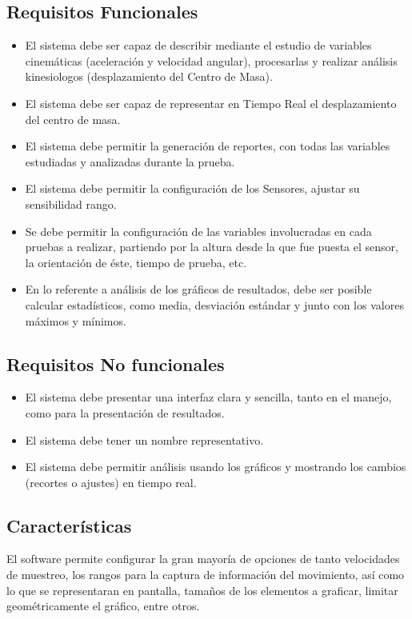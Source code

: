 \documentclass[12pt,a4paper]{article}
\begin{document}
\subsection{Requisitos Funcionales}
\begin{itemize}
\item El sistema debe ser capaz de describir mediante el estudio de variables cinemáticas (aceleración y velocidad angular), procesarlas y realizar análisis kinesiologos (desplazamiento del Centro de Masa).
\item El sistema debe ser capaz de representar en Tiempo Real el desplazamiento del centro de masa.
\item El sistema debe permitir la generación de reportes, con todas las variables estudiadas y analizadas durante la prueba.
\item El sistema debe permitir la configuración de los Sensores, ajustar su sensibilidad rango.
\item Se debe permitir la configuración de las variables involucradas en cada pruebas a realizar, partiendo por la altura desde la que fue puesta el sensor, la orientación de éste, tiempo de prueba, etc.
\item En lo referente a análisis de los gráficos de resultados, debe ser posible calcular estadísticos, como media, desviación estándar y junto con los valores máximos y mínimos.
\end{itemize} 

\subsection{Requisitos No funcionales}
\begin{itemize}
\item El sistema debe presentar una interfaz clara y sencilla, tanto en el manejo, como para la presentación de resultados.
\item El sistema debe tener un nombre representativo.
\item El sistema debe permitir análisis usando los gráficos y mostrando los cambios (recortes o ajustes) en tiempo real.
\end{itemize}

\subsection{Características}
El software permite configurar la gran mayoría de opciones de tanto velocidades de muestreo, los rangos para la captura de información del movimiento, así como lo que se representaran en pantalla, tamaños de los elementos a graficar, limitar geométricamente el gráfico, entre otros.
\end{document}
